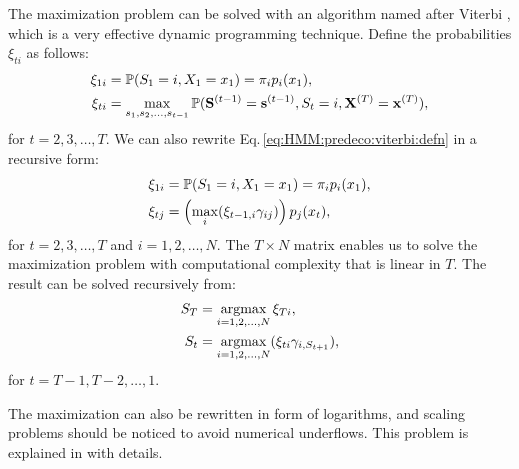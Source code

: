 The maximization problem can be solved with an algorithm named after Viterbi \cite{Viterbi:1967hq},
which is a very effective dynamic programming technique.
Define the probabilities $\xi_{ti}$ as follows:
		\begin{equation}
		\label{eq:HMM:predeco:viterbi:defn}
		\begin{aligned}
		\xi_{1i} & = \mathbb{P}(S_1 = i,X_1 = x_1) = \pi_ip_i(x_1), \\
		\xi_{ti} & = \max_{s_1,s_2,\dots,s_{t-1}} 
			\mathbb{P}({\mathbf S}^{(t-1)} = {\mathbf s}^{(t-1)},S_t = i, {\mathbf X}^{(T)} = {\mathbf x}^{(T)}),
		\end{aligned}
		\end{equation}
for $t = 2,3,\dots,T$.
We can also rewrite Eq.\,\ref{eq:HMM:predeco:viterbi:defn} in a recursive form:
		\begin{equation}
		\label{eq:HMM:predeco:viterbi:defn_2}
		\begin{aligned}
		\xi_{1i} & = \mathbb{P}(S_1 = i,X_1 = x_1) = \pi_ip_i(x_1), \\
		\xi_{tj} & = \left(\max_i(\xi_{t-1,i}\gamma_{ij})\right)p_j(x_t),
		\end{aligned}
		\end{equation}
for $t = 2,3,\dots,T$ and $i = 1,2,\dots,N$.
The $T\times N$ matrix enables us to solve the maximization problem with 
computational complexity that is linear in $T$.
The result can be solved recursively from:
		\begin{equation}
		\label{eq:HMM:predeco:viterbi:defn_3}
		\begin{aligned}
		S_T & = \operatorname*{argmax}_{i = 1,2,\dots,N} \xi_{Ti}, \\
		S_t & = \operatorname*{argmax}_{i = 1,2,\dots,N} (\xi_{ti}\gamma_{i,S_{t+1}}),
		\end{aligned}
		\end{equation}
for $t = T-1, T-2,\dots,1$.

The maximization can also be rewritten in form of logarithms,
and scaling problems should be noticed to avoid numerical underflows.
This problem is explained in \cite{Zucchini:2009df} with details.





